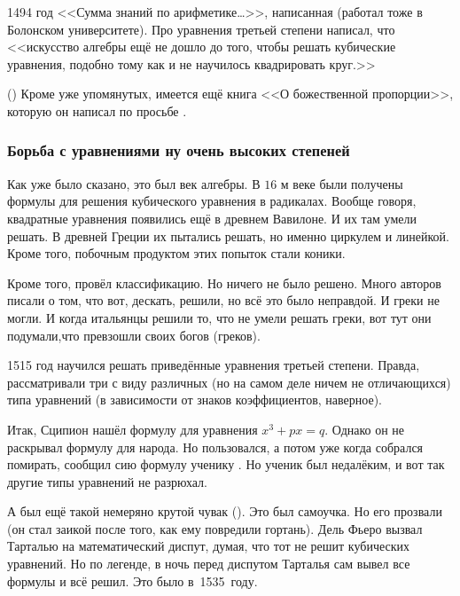 \documentclass[a4paper,oneside,fleqn,10pt]{article}
\begin{document}
1494 год <<Сумма знаний по арифметике\ldots>>, написанная  (работал тоже в Болонском университете). Про
уравнения третьей степени написал, что <<искусство алгебры ещё не
дошло до того, чтобы решать кубические уравнения, подобно тому как и
не научилось квадрировать круг.>>

 ()
Кроме уже упомянутых, имеется ещё книга <<О божественной пропорции>>,
которую он написал по просьбе .

\subsubsection{Борьба с уравнениями ну очень высоких степеней}

Как уже было сказано, это был век алгебры. В $16$ м веке были получены
формулы для решения кубического уравнения в радикалах. Вообще говоря,
квадратные уравнения появились ещё в древнем Вавилоне. И их там умели
решать. В древней Греции их пытались решать, но именно циркулем и
линейкой. Кроме того, побочным продуктом этих попыток стали коники.

Кроме того,  провёл классификацию. Но ничего
не было решено. Много авторов писали о том, что вот, дескать, решили,
но всё это было неправдой. И греки не могли.  И когда итальянцы решили
то, что не умели решать греки, вот тут они подумали,что превзошли
своих богов (греков).

1515 год  научился решать приведённые
уравнения третьей степени.  Правда, рассматривали три с виду различных
(но на самом деле ничем не отличающихся) типа уравнений (в зависимости
от знаков коэффициентов, наверное).

Итак, Сципион нашёл формулу для уравнения $x^3 + px = q$. Однако он не
раскрывал формулу для народа.  Но пользовался, а потом уже когда
собрался помирать, сообщил сию формулу ученику .  Но
ученик был недалёким, и вот так другие типы уравнений не разрюхал.

А был ещё такой немеряно крутой чувак 
(). Это был самоучка.  Но его прозвали 
(он стал заикой после того, как ему повредили гортань).  Дель Фьеро
вызвал Тарталью на математический диспут, думая, что тот не решит
кубических уравнений.  Но по легенде, в ночь перед диспутом Тарталья
сам вывел все формулы и всё решил.  Это было в~1535~году.
\end{document}
